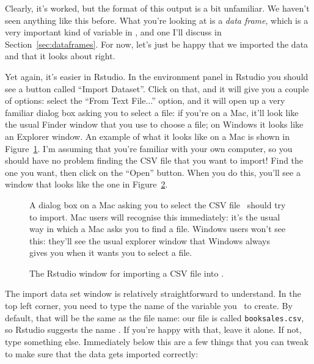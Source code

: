 Clearly, it's worked, but the format of this output is a bit unfamiliar. We haven't seen anything like this before. What you're looking at is a {\it data frame}, which is a very important kind of variable in \R, and one I'll discuss in Section~\ref{sec:dataframes}. For now, let's just be happy that we imported the data and that it looks about right.



Yet again, it's easier in Rstudio. In the environment panel in Rstudio you should see a button called ``Import Dataset''. Click on that, and it will give you a couple of options: select the ``From Text File...'' option, and it will open up a very familiar dialog box asking you to select a file: if you're on a Mac, it'll look like the usual Finder window that you use to choose a file; on Windows it looks like an Explorer window. An example of what it looks like on a Mac is shown in Figure~\ref{fig:fileopen}. I'm assuming that you're familiar with your own computer, so you should have no problem finding the CSV file that you want to import! Find the one you want, then click on the ``Open'' button. When you do this, you'll see a window that looks like the one in Figure~\ref{fig:import}.

\begin{figure}[t]
\begin{center}
\caption{A dialog box on a Mac asking you to select the CSV file \R\ should try to import. Mac users will recognise this immediately: it's the usual way in which a Mac asks you to find a file. Windows users won't see this: they'll see the usual explorer window that Windows always gives you when it wants you to select a file.}
\HR
\label{fig:fileopen}
\end{center}
\end{figure} 


\begin{figure}[t]
\begin{center}
\caption{The Rstudio window for importing a CSV file into \R.}
\HR
\label{fig:import}
\end{center}
\end{figure} 

The import data set window is relatively straightforward to understand. In the top left corner, you need to type the name of the variable you \R\ to create. By default, that will be the same as the file name: our file is called \texttt{booksales.csv}, so Rstudio suggests the name . If you're happy with that, leave it alone. If not, type something else. Immediately below this are a few things that you can tweak to make sure that the data gets imported correctly: 


